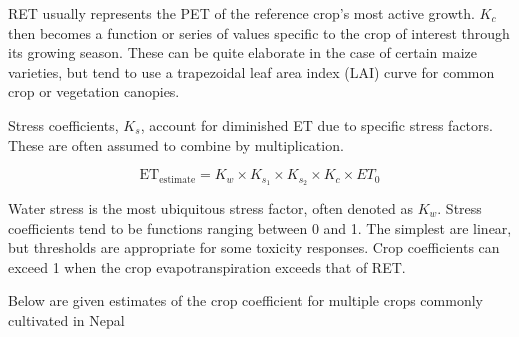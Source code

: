 \documentclass[
  openany]{book}
\begin{document}
RET usually represents the PET of the reference crop's most active growth. \(K_c\) then becomes a function or series of values specific to the crop of interest through its growing season. These can be quite elaborate in the case of certain maize varieties, but tend to use a trapezoidal leaf area index (LAI) curve for common crop or vegetation canopies.

Stress coefficients, \(K_s\), account for diminished ET due to specific stress factors. These are often assumed to combine by multiplication.

\[
\mathrm{ET_{estimate}} = K_w \times K_{s_1} \times K_{s_2} \times K_c \times ET_0
\]

Water stress is the most ubiquitous stress factor, often denoted as \(K_w\). Stress coefficients tend to be functions ranging between 0 and 1. The simplest are linear, but thresholds are appropriate for some toxicity responses. Crop coefficients can exceed 1 when the crop evapotranspiration exceeds that of RET.

Below are given estimates of the crop coefficient for multiple crops commonly cultivated in Nepal
\end{document}
